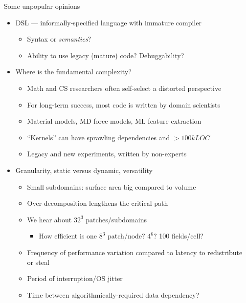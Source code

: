 \documentclass{beamer}
\begin{document}
\begin{frame}{Some unpopular opinions}
  \begin{itemize}
  \item DSL --- informally-specified language with immature compiler
    \begin{itemize}
    \item Syntax or \emph{semantics}?
    \item Ability to use legacy (mature) code?  Debuggability?
    \end{itemize}
  \item Where is the fundamental complexity?
    \begin{itemize}
    \item Math and CS researchers often self-select a distorted perspective
    \item For long-term success, most code is written by domain scientists
    \item Material models, MD force models, ML feature extraction
    \item ``Kernels'' can have sprawling dependencies and $> 100 kLOC$
    \item Legacy and new experiments, written by non-experts
    \end{itemize}
  \item Granularity, static versus dynamic, versatility
    \begin{itemize}
    \item Small subdomains: surface area big compared to volume
    \item Over-decomposition lengthens the critical path
    \item We hear about $32^3$ patches/subdomains
      \begin{itemize}
      \item How efficient is one $8^3$ patch/node? $4^6$? 100 fields/cell?
      \end{itemize}
    \item Frequency of performance variation compared to latency to redistribute or steal
    \item Period of interruption/OS jitter
    \item Time between algorithmically-required data dependency?
    \end{itemize}
  \end{itemize}
\end{frame}
\end{document}
